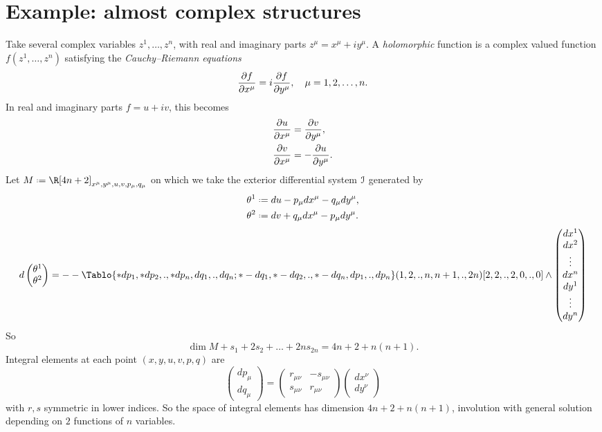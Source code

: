 \chapter{Example: almost complex structures}

%
Take several complex variables \(z^1,\dots,z^n\), with real and imaginary parts \(z^{\mu}=x^{\mu}+iy^{\mu}\).
A \emph{holomorphic} function is a complex valued function \(f(z^1,\dots,z^n)\) satisfying the \emph{Cauchy--Riemann equations} \cite{Demailly:2012,Gunning/Rossi:2009,Hoermander:1990,Shabat:1992,Taylor:2002}
\[
\pderiv{f}{x^{\mu}}=i\pderiv{f}{y^{\mu}}, \quad \mu=1,2,\dots,n.
\]
In real and imaginary parts \(f=u+iv\), this becomes
\begin{align*}
\pderiv{u}{x^{\mu}}&=\pderiv{v}{y^{\mu}},\\
\pderiv{v}{x^{\mu}}&=-\pderiv{u}{y^{\mu}}.
\end{align*}
Let \(M\defeq\R[4n+2]_{x^{\mu},y^{\mu},u,v,p_{\mu},q_{\mu}}\) on which we take the exterior differential system \(\mathcal{I}\) generated by
\begin{align*}
\theta^1&\defeq du-p_{\mu}dx^{\mu}-q_{\mu}dy^{\mu},\\
\theta^2&\defeq dv+q_{\mu}dx^{\mu}-p_{\mu}dy^{\mu}.
\end{align*}
\[
d
\begin{pmatrix}
\theta^1\\
\theta^2
\end{pmatrix}
=
-
-\Tablo{*dp_1,*dp_2,.,*dp_n,dq_1,.,dq_n;
*-dq_1,*-dq_2,.,*-dq_n,dp_1,.,dp_n}
(1,2,.,n,n+1,.,2n)
[2,2,.,2,0,.,0]
\wedge
\begin{pmatrix}
dx^1\\
dx^2\\
\vdots\\
dx^n\\
dy^1\\
\vdots\\
dy^n
\end{pmatrix}
\]
So 
\[
\dim M+s_1+2s_2+\dots+2ns_{2n}=4n+2+n(n+1).
\]
Integral elements at each point \((x,y,u,v,p,q)\) are 
\[
\begin{pmatrix}
dp_{\mu}\\
dq_{\mu}
\end{pmatrix}
=
\begin{pmatrix}
r_{\mu\nu} & -s_{\mu\nu}\\
s_{\mu\nu} & r_{\mu\nu}
\end{pmatrix}
\begin{pmatrix}
dx^{\nu}\\
dy^{\nu}
\end{pmatrix}
\]
with \(r,s\) symmetric in lower indices.
So the space of integral elements has dimension \(4n+2+n(n+1)\), involution with general solution depending on \(2\) functions of \(n\) variables.

